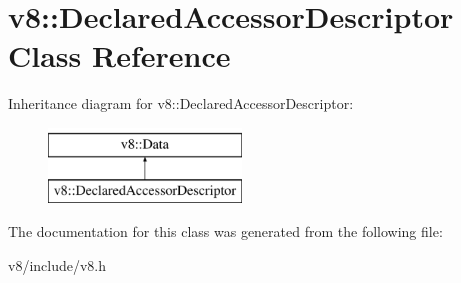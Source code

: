 \hypertarget{classv8_1_1DeclaredAccessorDescriptor}{}\section{v8\+:\+:Declared\+Accessor\+Descriptor Class Reference}
\label{classv8_1_1DeclaredAccessorDescriptor}
Inheritance diagram for v8\+:\+:Declared\+Accessor\+Descriptor\+:\begin{figure}[H]
\begin{center}
\leavevmode
\includegraphics[height=2.000000cm]{classv8_1_1DeclaredAccessorDescriptor}
\end{center}
\end{figure}


The documentation for this class was generated from the following file\+:\begin{DoxyCompactItemize}
\item 
v8/include/v8.\+h\end{DoxyCompactItemize}
